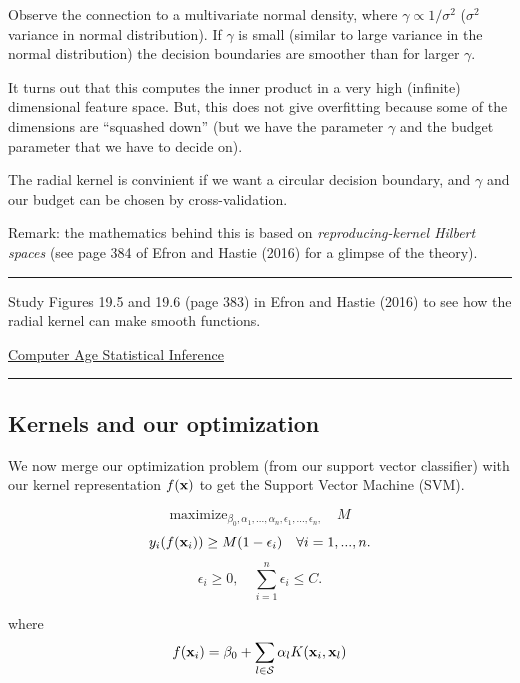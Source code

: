\documentclass[]{article}
\begin{document}
Observe the connection to a multivariate normal density, where
\(\gamma \propto 1/\sigma^2\) (\(\sigma^2\) variance in normal
distribution). If \(\gamma\) is small (similar to large variance in the
normal distribution) the decision boundaries are smoother than for
larger \(\gamma\).

It turns out that this computes the inner product in a very high
(infinite) dimensional feature space. But, this does not give
overfitting because some of the dimensions are ``squashed down'' (but we
have the parameter \(\gamma\) and the budget parameter that we have to
decide on).

The radial kernel is convinient if we want a circular decision boundary,
and \(\gamma\) and our budget can be chosen by cross-validation.

Remark: the mathematics behind this is based on \emph{reproducing-kernel
Hilbert spaces} (see page 384 of Efron and Hastie (2016) for a glimpse
of the theory).

\begin{center}\rule{0.5\linewidth}{\linethickness}\end{center}

Study Figures 19.5 and 19.6 (page 383) in Efron and Hastie (2016) to see
how the radial kernel can make smooth functions.

\href{https://web.stanford.edu/~hastie/CASI_files/PDF/casi.pdf}{Computer
Age Statistical Inference}

\begin{center}\rule{0.5\linewidth}{\linethickness}\end{center}

\hypertarget{kernels-and-our-optimization}{%
\subsection{Kernels and our
optimization}\label{kernels-and-our-optimization}}

We now merge our optimization problem (from our support vector
classifier) with our kernel representation \(f({\bf x})\) to get the
Support Vector Machine (SVM).

\[\mathrm{maximize}_{\beta_0,\alpha_1,...,\alpha_n,\epsilon_1,...,\epsilon_n,} \quad M \]
\[y_i(f({\bf x}_i))\geq M(1-\epsilon_i) \quad  \forall i=1,...,n.\]
\[\epsilon_i\geq 0, \quad \sum_{i=1}^n \epsilon_i \leq C.\]

where
\[f({\bf x}_i)=\beta_0 +\sum_{l\in \cal{S}} \alpha_l K({\bf x}_i,{\bf x}_l)\]
\end{document}
